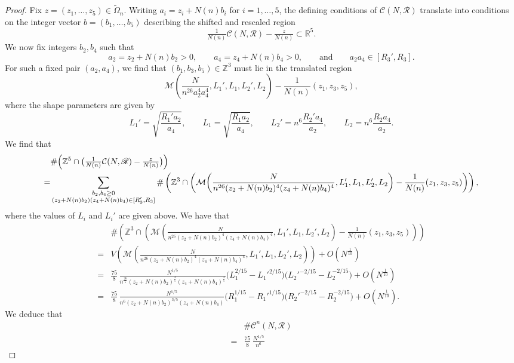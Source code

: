 \documentclass[10pt,a4paper]{amsart}
\newcommand{\Z}{\mathbb{Z}}
\begin{document}
\begin{proof}
Fix $z=(z_1,\dots,z_5)\in\widetilde{\Omega}_n$. Writing
$a_i=z_i+N(n) b_i$ for $i=1,\dots,5$, the defining conditions of
$\mathcal{C}(N,\mathscr{R})$ translate into conditions on the integer vector
$b=(b_1,\dots,b_5)$ describing the shifted and rescaled region
\[
\tfrac{1}{N(n)}\mathcal{C}(N,\mathscr{R})-\tfrac{z}{N(n)}\subset\mathbb{R}^5.
\]
We now fix integers $b_2,b_4$ such that
\[
a_2=z_2+N(n) b_2>0,\qquad a_4=z_4+N(n) b_4>0,
\qquad\text{and}\qquad
a_2 a_4\in [R_3',R_3].
\]
For such a fixed pair $(a_2,a_4)$, we find that $(b_1,b_3,b_5)\in\mathbb{Z}^3$ must lie in the translated region
\[
\mathcal{M}\!\left(
\frac{N}{n^{26}a_2^4 a_4^4},
L_1',L_1,L_2',L_2
\right)
-
\frac{1}{N(n)}(z_1,z_3,z_5),
\]
where the shape parameters are given by
\[
L_1'=\sqrt{\frac{R_1' a_2}{a_4}},\qquad
L_1=\sqrt{\frac{R_1 a_2}{a_4}},\qquad
L_2'=n^6\frac{R_2' a_4}{a_2},\qquad
L_2=n^6\frac{R_2 a_4}{a_2}.
\]
We find that 
\[\begin{split}
&\#\Bigl(\mathbb{Z}^5\cap\bigl(\tfrac{1}{N(n)}\mathcal{C}(N,\mathscr{R})-\tfrac{z}{N(n)}\bigr)\Bigr)\\
=&\sum_{\substack{b_2,b_4\geq 0\\
(z_2+N(n)b_2)(z_4+N(n)b_4)\in [R_3', R_3]}}\# \left(\Z^3\cap\left(\mathcal{M}\!\left(
\frac{N}{n^{26}(z_2+N(n)b_2)^4 (z_4+N(n)b_4)^4},
L_1',L_1,L_2',L_2
\right)
-
\frac{1}{N(n)}(z_1,z_3,z_5)\right)\right),
\end{split}\]
where the values of $L_i$ and $L_i'$ are given above. We have that 
\[\begin{split}&\# \left(\Z^3\cap\left(\mathcal{M}\!\left(
\frac{N}{n^{26}(z_2+N(n)b_2)^4 (z_4+N(n)b_4)^4},
L_1',L_1,L_2',L_2
\right)
-
\frac{1}{N(n)}(z_1,z_3,z_5)\right)\right)\\
=& V\left(\mathcal{M}\!\left(
\frac{N}{n^{26}(z_2+N(n)b_2)^4 (z_4+N(n)b_4)^4},
L_1',L_1,L_2',L_2
\right)\right)+O(N^{\frac{1}{10}})\\
=& \frac{75}{8}\,\frac{N^{1/5}}{n^{\frac{26}{5}}(z_2+N(n)b_2)^{\frac{4}{5}} (z_4+N(n)b_4)^{\frac{4}{5}}}
\bigl(L_1^{2/15}-L_1'^{2/15}\bigr)
\bigl(L_2'^{-2/15}-L_2^{-2/15}\bigr)+O\left( N^{\frac{1}{10}}\right)\\
=&\frac{75}{8}\,\frac{N^{1/5}}{n^{6}(z_2+N(n)b_2)^{3/5} (z_4+N(n)b_4)}
\bigl(R_1^{1/15}-R_1'^{1/15}\bigr)
\bigl(R_2'^{-2/15}-R_2^{-2/15}\bigr)+O\left( N^{\frac{1}{10}}\right).
\end{split}\]
We deduce that 
\[\begin{split}&\#\mathcal{C}^n(N,\mathscr{R})\\
=&\frac{75}{8}\,\frac{N^{1/5}}{n^{6}}

\end{split}\]
\end{proof}
\end{document}
